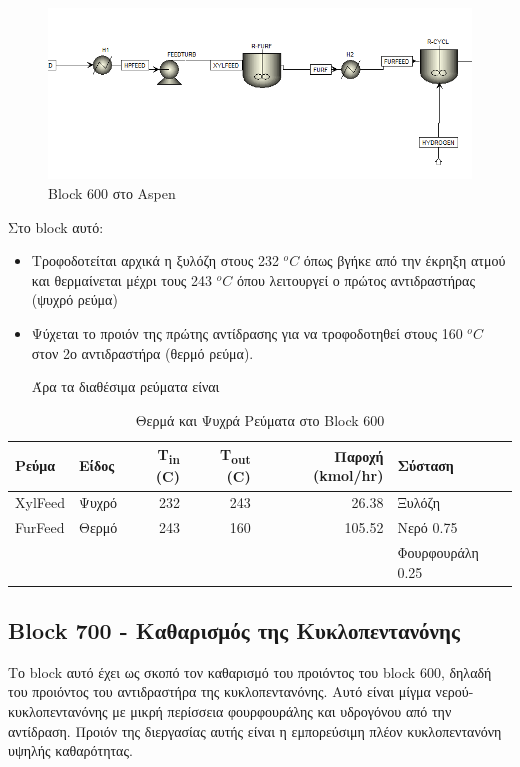 \documentclass[11pt]{article}
\begin{document}
\begin{figure}[htbp]
\centering
\includegraphics[width=.9\linewidth]{Block_600_-_Παραγωγή_Κυκλοπεντανόνης_με_την_Φουρφουράλη_ως_Ενδιάμεσο/2023-03-11_17-58-53_screenshot.png}
\caption{Block 600 στο Aspen}
\end{figure}

Στο block αυτό:
\begin{itemize}
\item Τροφοδοτείται αρχικά η ξυλόζη στους 232 \(^oC\) όπως βγήκε από την έκρηξη ατμού και θερμαίνεται μέχρι τους 243 \(^oC\) όπου λειτουργεί ο πρώτος αντιδραστήρας (ψυχρό ρεύμα)
\item Ψύχεται το προιόν της πρώτης αντίδρασης για να τροφοδοτηθεί στους 160 \(^oC\) στον 2ο αντιδραστήρα (θερμό ρεύμα).

Άρα τα διαθέσιμα ρεύματα είναι
\end{itemize}
\begin{table}[htbp]
\caption{Θερμά και Ψυχρά Ρεύματα στο Block 600}
\centering
\begin{tabular}{llrrrl}
Ρεύμα & Είδος & Τ\textsubscript{in} (C) & Τ\textsubscript{out} (C) & Παροχή (kmol/hr) & Σύσταση\\
\hline
XylFeed & Ψυχρό & 232 & 243 & 26.38 & Ξυλόζη\\
\hline
FurFeed & Θερμό & 243 & 160 & 105.52 & Νερό 0.75\\
 &  &  &  &  & Φουρφουράλη 0.25\\
\hline
\end{tabular}
\end{table}

\subsection{Block 700 - Καθαρισμός της Κυκλοπεντανόνης}
\label{sec:org9fd7ec1}
Το block αυτό έχει ως σκοπό τον καθαρισμό του προιόντος του block 600, δηλαδή του προιόντος του αντιδραστήρα της κυκλοπεντανόνης. Αυτό είναι μίγμα νερού-κυκλοπεντανόνης με μικρή περίσσεια φουρφουράλης και υδρογόνου από την αντίδραση. Προιόν της διεργασίας αυτής είναι η εμπορεύσιμη πλέον κυκλοπεντανόνη υψηλής καθαρότητας.
\end{document}
